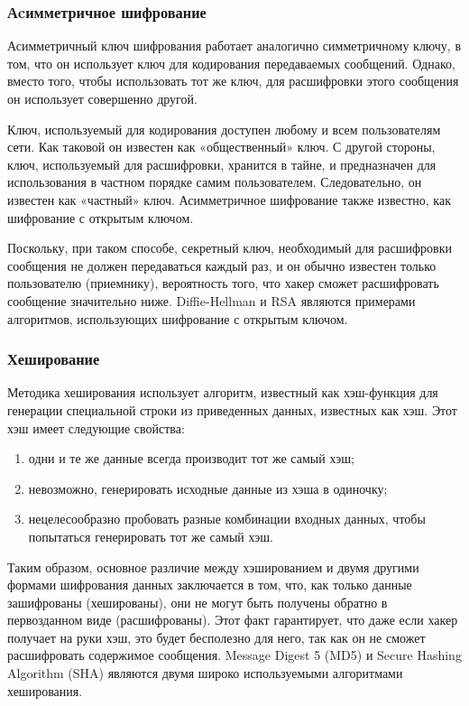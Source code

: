 \documentclass[a4paper, 10pt]{article}
\begin{document}
	\subsubsection{Аcимметричное шифрование}
	\hspace*{5mm}Асимметричный ключ шифрования работает аналогично симметричному ключу, в том, что он использует ключ для кодирования передаваемых сообщений. Однако, вместо того, чтобы использовать тот же ключ, для расшифровки этого сообщения он использует совершенно другой. 
	
	Ключ, используемый для кодирования доступен любому и всем пользователям сети. Как таковой он известен как «общественный» ключ. С другой стороны, ключ, используемый для расшифровки, хранится в тайне, и предназначен для использования в частном порядке самим пользователем. Следовательно, он известен как «частный» ключ. Асимметричное шифрование также известно, как шифрование с открытым ключом. 
	
	Поскольку, при таком способе, секретный ключ, необходимый для расшифровки сообщения не должен передаваться каждый раз, и он обычно известен только пользователю (приемнику), вероятность того, что хакер сможет расшифровать сообщение значительно ниже. Diffie-Hellman и RSA являются примерами алгоритмов, использующих шифрование с открытым ключом.
	
	\subsubsection{Хеширование}
	\hspace*{5mm}Методика хеширования использует алгоритм, известный как хэш-функция для генерации специальной строки из приведенных данных, известных как хэш. Этот хэш имеет следующие свойства:
	\begin{enumerate}
		\item одни и те же данные всегда производит тот же самый хэш;
		\item невозможно, генерировать исходные данные из хэша в одиночку;
		\item нецелесообразно пробовать разные комбинации входных данных, чтобы попытаться генерировать тот же самый хэш.
	\end{enumerate}

	Таким образом, основное различие между хэшированием и двумя другими формами шифрования данных заключается в том, что, как только данные зашифрованы (хешированы), они не могут быть получены обратно в первозданном виде (расшифрованы). Этот факт гарантирует, что даже если хакер получает на руки хэш, это будет бесполезно для него, так как он не сможет расшифровать содержимое сообщения. Message Digest 5 (MD5) и Secure Hashing Algorithm (SHA) являются двумя широко используемыми алгоритмами хеширования.
	
\end{document}
